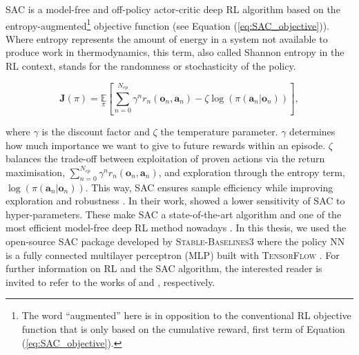 \gls{SAC} is a model-free and off-policy actor-critic deep \gls{RL} algorithm based on the entropy-augmented\footnote{The word ``augmented'' here is in opposition to the conventional \gls{RL} objective function that is only based on the cumulative reward, \ie first term of Equation (\ref{eq:SAC_objective}).} objective function (see Equation (\ref{eq:SAC_objective})). Where entropy represents the amount of energy in a system not available to produce work in thermodynamics, this term, also called Shannon entropy in the \gls{RL} context, stands for the randomness or stochasticity of the policy.

\begin{equation}
    \label{eq:SAC_objective}
    \bm{J}(\pi) = \underset{\pi}{\mathbb{E}}\left[\underset{n=0}{\overset{N_{ep}}{\sum}}\gamma^n r_n\left(\bm{o}_n,\bm{a}_n \right) - \zeta \log \left(\pi\left(\bm{a}_n | \bm{o}_n\right) \right) \right],
\end{equation}

\noindent
where $\gamma$ is the discount factor and $\zeta$ the temperature parameter. $\gamma$ determines how much importance we want to give to future rewards within an episode. $\zeta$ balances the trade-off between exploitation of proven actions via the return maximisation, \ie $\sum_{n=0}^{N_{ep}}\gamma^n r_n\left(\bm{o}_n,\bm{a}_n \right)$, and exploration through the entropy term, \ie $\log \left(\pi\left(\bm{a}_n | \bm{o}_n\right) \right)$. This way, \gls{SAC} ensures sample efficiency while improving exploration \cite{haarnoja2017reinforcement} and robustness \cite{ziebart2010modeling}. In their work, \citet{haarnoja2017reinforcement} showed a lower sensitivity of \gls{SAC} to hyper-parameters. These make \gls{SAC} a state-of-the-art algorithm and one of the most efficient model-free deep RL method nowadays \cite{haarnoja2017reinforcement}. In this thesis, we used the open-source \gls{SAC} package developed by \textsc{Stable-Baselines3} \cite{raffin2021stable} where the policy \gls{NN} is a fully connected multilayer perceptron (MLP) built with \textsc{TensorFlow} \cite{abadi2016tensorflow}. For further information on \gls{RL} and the \gls{SAC} algorithm, the interested reader is invited to refer to the works of \citet{sutton2018reinforcement} and \citet{haarnoja2018soft}, respectively.


